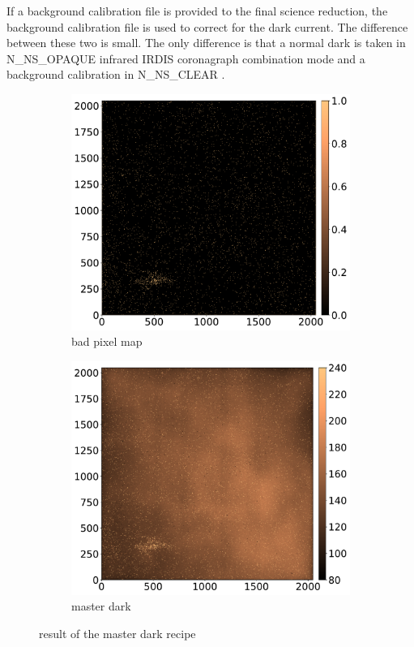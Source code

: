 \documentclass[twoside,single,12pt]{lion-msc}
\begin{document}
If a background calibration file is provided to the final science reduction, the background calibration file is used to correct for the dark current. The difference between these two is small. The only difference is that a normal dark is taken in N\_NS\_OPAQUE infrared IRDIS coronagraph combination mode and a background calibration in N\_NS\_CLEAR \cite{Mouillet2013}.

\begin{figure}[!t]
\centering
\vspace{-5mm}
\begin{subfigure}{.48\textwidth}
  \centering
  \includegraphics[width=1\linewidth]{badpixelmap}
  \caption{bad pixel map}
\end{subfigure}\hfill
\begin{subfigure}{.48\textwidth}
  \centering
  \includegraphics[width=1\linewidth]{dark}
  \caption{master dark}
\end{subfigure}
\caption{result of the master dark recipe}
\label{fig:masterdark}
\vspace{-5mm}
\end{figure}
\end{document}
